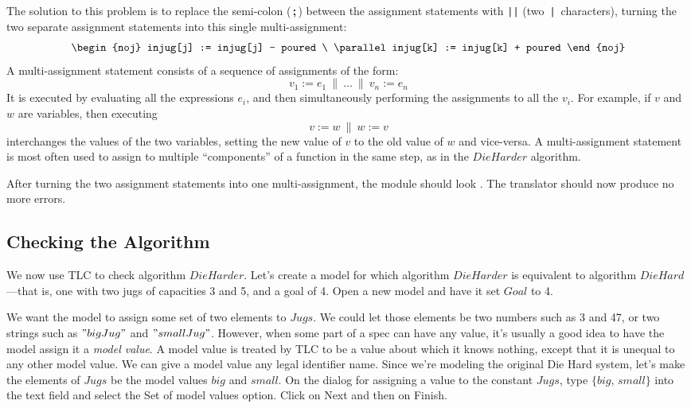 \documentclass[fleqn,leqno]{article}
\begin{document}
The solution to this problem is to replace the semi-colon
(\,\textbf{;}\,) between the assignment statements with
\texttt{||} (two \,\texttt{|}\, characters), turning the two
separate assignment statements into this single multi-assignment:
 \[ \begin{noj}
    injug[j] := injug[j] - poured \ \parallel 
                      injug[k] := injug[k] + poured
    \end{noj}
 \]
A multi-assignment statement consists of a sequence of assignments
of the form:
  \[ v_{1} := e_{1} \ \parallel \ \ldots \ \parallel \ v_{n} := e_{n} \]
It is executed by evaluating all the expressions $e_{i}$, and then
simultaneously performing the assignments to all the $v_{i}$.
For example, if $v$ and $w$ are variables, then executing
  \[ v := w \ \parallel \ w := v \]
interchanges the values of the two variables, setting the new value of
$v$ to the old value of $w$ and vice-versa.  A multi-assignment
statement is most often used to assign to multiple ``components'' of a
function in the same step, as in the $DieHarder$ algorithm.

After turning the two assignment statements into one multi-assignment,
the module should look .  The translator
should now produce no more errors.

\subsection{Checking the Algorithm}

We now use TLC to check algorithm $DieHarder$.  Let's create a model for
which algorithm $DieHarder$ is equivalent to algorithm $DieHard$---that is,
one with two jugs of capacities 3 and 5, and a goal of 4.  Open a new model
and have it set $Goal$ to 4.

We want the model to assign some set of two elements to $Jugs$.  We
could let those elements be two numbers such as 3 and 47, or two
strings such as $"bigJug"$ and $"smallJug"$.  However, when some part
of a spec can have any value, it's usually a good idea to have
the model assign it a 
\emph{model value}.  
A model value is treated by TLC to be a value
about which it knows nothing, except that it is unequal to any other
model value.  We can give a model value any legal identifier name.
Since we're modeling the original Die Hard system, let's make the
elements of $Jugs$ be the model values $big$ and $small$.  On the dialog
for assigning a value to the constant $Jugs$, type 
 $\{big,\,small\}$
into the text field and select the \textsf{Set of model values}
option.  Click on \textsf{Next} and then on \textsf{Finish}.  
\end{document}
